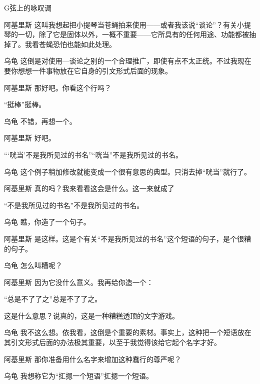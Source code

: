 \begin{dialog}{G弦上的咏叹调}
\begin{dialogue}
\item[阿基里斯]这叫我想起把小提琴当苍蝇拍来使用——或者我该说“谈论”？有关小提琴的一切，除了它是固体以外，一概不重要——它所具有的任何用途、功能都被抽掉了。我看苍蝇恐怕也能如此处理。

\item[乌龟]这倒是对使用—谈论之别的一个合理推广，即使有点不太正统。不过我现在要你想想一件事物放在它自身的引文形式后面的现象。

\item[阿基里斯]那好吧。你看这个行吗？
\begin{block}
“挺棒”挺棒。
\end{block}

\item[乌龟]不错，再想一个。

\item[阿基里斯]好吧。
\begin{block}
“‘咣当’不是我所见过的书名”“咣当”不是我所见过的书名。
\end{block}

\item[乌龟]这个例子稍加修改就能变成一个很有意思的典型。只消去掉“咣当”就行了。

\item[阿基里斯]真的吗？我来看看这会是什么。这一来就成了
\begin{block}
“不是我所见过的书名”不是我所见过的书名。
\end{block}

\item[乌龟]瞧，你造了一个句子。

\item[阿基里斯]是这样。这是个有关“不是我所见过的书名”这个短语的句子，是个很糟的句子。

\item[乌龟]怎么叫糟呢？

\item[阿基里斯]因为它没什么意义。我再给你造一个：
\begin{block}
“总是不了了之”总是不了了之。
\end{block}
这是什么意思？说真的，这是一种糟糕透顶的文字游戏。

\item[乌龟]我不这么想。依我看，这倒是个重要的素材。事实上，这种把一个短语放在其引文形式后面的办法极其重要，以至于我觉得该给它起个名字才好。

\item[阿基里斯]那你准备用什么名字来增加这种蠢行的尊严呢？

\item[乌龟]我想称它为“㧟摁一个短语”㧟摁一个短语。


\end{dialogue}
\end{dialog}
